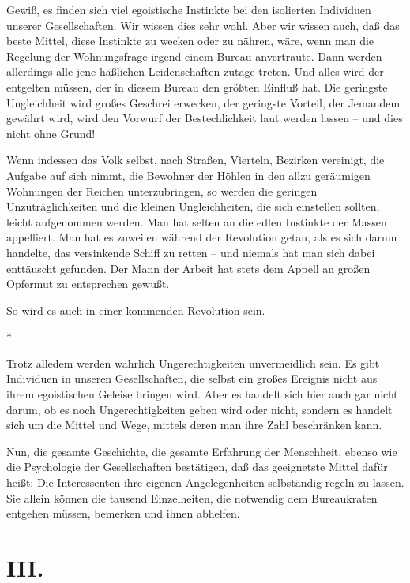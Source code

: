 \documentclass{scrbook}
\begin{document}
Gewiß, es finden sich viel egoistische Instinkte bei den isolierten Individuen unserer Gesellschaften. Wir wissen dies sehr wohl. Aber wir wissen auch, daß das beste Mittel, diese Instinkte zu wecken oder zu nähren, wäre, wenn man die Regelung der Wohnungsfrage irgend einem Bureau anvertraute. Dann werden allerdings alle jene häßlichen Leidenschaften zutage treten. Und alles wird der entgelten müssen, der in diesem Bureau den größten Einfluß hat. Die geringste Ungleichheit wird großes Geschrei erwecken, der geringste Vorteil, der Jemandem gewährt wird, wird den Vorwurf der Bestechlichkeit laut werden lassen – und dies nicht ohne Grund!

Wenn indessen das Volk selbst, nach Straßen, Vierteln, Bezirken vereinigt, die Aufgabe auf sich nimmt, die Bewohner der Höhlen in den allzu geräumigen Wohnungen der Reichen unterzubringen, so werden die geringen Unzuträglichkeiten und die kleinen Ungleichheiten, die sich einstellen sollten, leicht aufgenommen werden. Man hat selten an die edlen Instinkte der Massen appelliert. Man hat es zuweilen während der Revolution getan, als es sich darum handelte, das versinkende Schiff zu retten – und niemals hat man sich dabei enttäuscht gefunden. Der Mann der Arbeit hat stets dem Appell an großen Opfermut zu entsprechen gewußt.

So wird es auch in einer kommenden Revolution sein.

\begin{center}*\end{center}

Trotz alledem werden wahrlich Ungerechtigkeiten unvermeidlich sein. Es gibt Individuen in unseren Gesellschaften, die selbst ein großes Ereignis nicht aus ihrem egoistischen Geleise bringen wird. Aber es handelt sich hier auch gar nicht darum, ob es noch Ungerechtigkeiten geben wird oder nicht, sondern es handelt sich um die Mittel und Wege, mittels deren man ihre Zahl beschränken kann.

Nun, die gesamte Geschichte, die gesamte Erfahrung der Menschheit, ebenso wie die Psychologie der Gesellschaften bestätigen, daß das geeignetste Mittel dafür heißt: Die Interessenten ihre eigenen Angelegenheiten selbständig regeln zu lassen. Sie allein können die tausend Einzelheiten, die notwendig dem Bureaukraten entgehen müssen, bemerken und ihnen abhelfen.

\section*{III.}
\end{document}
